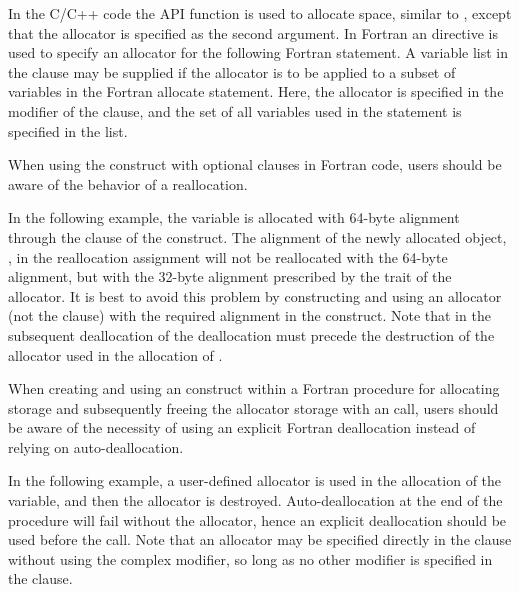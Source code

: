 In the C/C++ code the API   function is used
to allocate space, similar to , except that the allocator
is specified as the second argument.
In Fortran an  directive is used to specify an allocator
for the following Fortran  statement.
A variable list in the  clause may be supplied if the allocator
is to be applied to a subset of variables in the Fortran allocate
statement.
Here, the  allocator is specified
in the modifier of the  clause,
and the set of all variables used in the  statement is specified in the list.




When using the  construct with optional clauses in Fortran code, 
users should be aware of the behavior of a reallocation.

In the following example, the  variable is allocated with 64-byte
alignment through the  clause of the  construct.
The alignment of the newly allocated object, , in the reallocation
assignment  will not be reallocated with the 64-byte alignment, but
with the 32-byte alignment prescribed by the trait of the  
allocator. It is best to avoid this problem by constructing and using an
allocator (not the  clause) with the required alignment in 
the  construct.
Note that in the subsequent
deallocation of  the deallocation must precede the destruction
of the allocator used in the allocation of .

\clearpage

When creating and using an  construct within a Fortran procedure
for allocating storage and subsequently freeing the allocator storage with an 
 call, users should be aware of the necessity
of using an explicit Fortran deallocation instead of relying on auto-deallocation.

In the following example, a user-defined allocator is used in the allocation
of the  variable, and then the allocator is destroyed.
Auto-deallocation at the end of the  procedure
will fail without the allocator, hence an explicit deallocation should be used 
before the  call.
Note that an allocator may be specified directly in the  clause
without using the  complex modifier, so long as no other modifier 
is specified in the clause.


